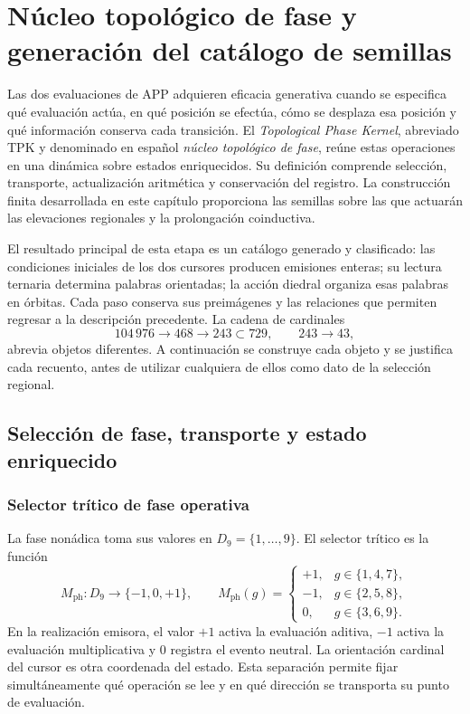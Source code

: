 \section{Núcleo topológico de fase y generación del catálogo de semillas}
\label{tpk:capitulo}

Las dos evaluaciones de APP adquieren eficacia generativa cuando se especifica
qué evaluación actúa, en qué posición se efectúa, cómo se desplaza esa posición
y qué información conserva cada transición. El \emph{Topological Phase Kernel},
abreviado TPK y denominado en español \emph{núcleo topológico de fase}, reúne
estas operaciones en una dinámica sobre estados enriquecidos. Su definición
comprende selección, transporte, actualización aritmética y conservación del
registro. La construcción finita desarrollada en este capítulo proporciona
las semillas sobre las que actuarán las elevaciones regionales y la prolongación
coinductiva.

El resultado principal de esta etapa es un catálogo generado y clasificado:
las condiciones iniciales de los dos cursores producen emisiones enteras;
su lectura ternaria determina palabras orientadas; la acción diedral organiza
esas palabras en órbitas. Cada paso conserva sus preimágenes y las relaciones
que permiten regresar a la descripción precedente. La cadena de cardinales
\[
 104\,976\longrightarrow468\longrightarrow243\subset729,
 \qquad 243\longrightarrow43,
\]
abrevia objetos diferentes. A continuación se construye cada objeto y se
justifica cada recuento, antes de utilizar cualquiera de ellos como dato de
la selección regional.

\subsection{Selección de fase, transporte y estado enriquecido}
\label{tpk:operaciones}

\subsubsection{Selector trítico de fase operativa}

La fase nonádica toma sus valores en \(D_9=\{1,\ldots,9\}\). El selector
trítico es la función
\begin{equation}
 M_{\mathrm{ph}}:D_9\longrightarrow\{-1,0,+1\},\qquad
 M_{\mathrm{ph}}(g)=
 \begin{cases}
 +1,&g\in\{1,4,7\},\\
 -1,&g\in\{2,5,8\},\\
 0,&g\in\{3,6,9\}.
 \end{cases}
 \label{tpk:selector}
\end{equation}
En la realización emisora, el valor \(+1\) activa la evaluación aditiva,
\(-1\) activa la evaluación multiplicativa y \(0\) registra el evento
neutral. La orientación cardinal del cursor es otra coordenada del estado.
Esta separación permite fijar simultáneamente qué operación se lee y en qué
dirección se transporta su punto de evaluación.

